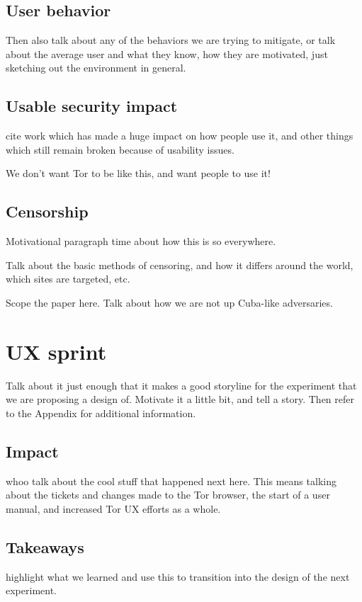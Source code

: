 \documentclass[letterpaper,twocolumn,10pt]{article}
\begin{document}
\subsection{User behavior}
Then also talk about any of the behaviors we are trying to mitigate,
or talk about the average user and what they know, how they are motivated,
just sketching out the environment in general. 

\subsection{Usable security impact} 
cite work which has made a huge impact on how people use it, and 
other things which still remain broken because of usability issues. 

We don't want Tor to be like this, and want people to use it!

\subsection{Censorship} 
Motivational paragraph time about how this is so everywhere. 

Talk about the basic methods of censoring, and how it differs 
around the world, which sites are targeted, etc. 

Scope the paper here. Talk about how we are not up Cuba-like adversaries. 

\section{UX sprint} 
Talk about it just enough that it makes a good storyline for the experiment that we 
are proposing a design of. Motivate it a little bit, and tell a story. Then refer to the 
Appendix for additional information.  

\subsection{Impact}
whoo talk about the cool stuff that happened next here. 
This means talking about the tickets and changes made 
to the Tor browser, the start of a user manual, and 
increased Tor UX efforts as a whole.

\subsection{Takeaways} 
highlight what we learned and use this to transition into 
the design of the next experiment. 
\end{document}
